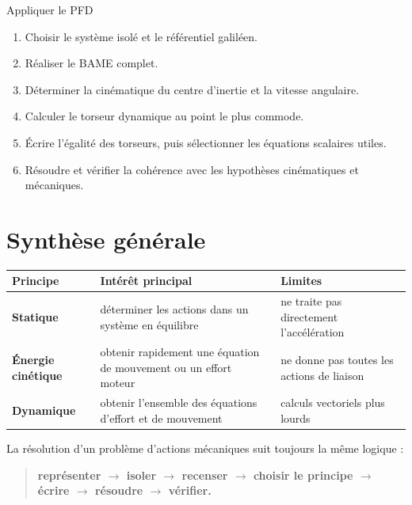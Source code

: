 \begin{TLMethod}{Appliquer le PFD}
\begin{enumerate}
  \item Choisir le système isolé et le référentiel galiléen.
  \item Réaliser le BAME complet.
  \item Déterminer la cinématique du centre d'inertie et la vitesse angulaire.
  \item Calculer le torseur dynamique au point le plus commode.
  \item Écrire l'égalité des torseurs, puis sélectionner les équations scalaires utiles.
  \item Résoudre et vérifier la cohérence avec les hypothèses cinématiques et mécaniques.
\end{enumerate}
\end{TLMethod}

\section{Synthèse générale}
\label{sec:am-12}

\begin{center}
\small
\begin{tabularx}{\linewidth}{>{\bfseries}l X X}
\toprule
Principe & Intérêt principal & Limites \\
\midrule
Statique & déterminer les actions dans un système en équilibre & ne traite pas directement l'accélération \\
Énergie cinétique & obtenir rapidement une équation de mouvement ou un effort moteur & ne donne pas toutes les actions de liaison \\
Dynamique & obtenir l'ensemble des équations d'effort et de mouvement & calculs vectoriels plus lourds \\
\bottomrule
\end{tabularx}
\end{center}

La résolution d'un problème d'actions mécaniques suit toujours la même logique :
\begin{quote}
\centering
\textbf{représenter $\rightarrow$ isoler $\rightarrow$ recenser $\rightarrow$ choisir le principe $\rightarrow$ écrire $\rightarrow$ résoudre $\rightarrow$ vérifier.}
\end{quote}
